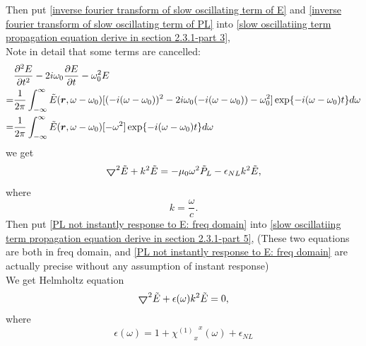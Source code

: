 \documentclass[12pt]{extarticle}
\numberwithin{equation}{section}
\numberwithin{figure}{section}
\numberwithin{table}{section}
\newcommand{\<}{\langle}
\renewcommand{\>}{\rangle}
\theoremstyle{definition}
\newcommand{\Lap}{\boldsymbol{\bigtriangledown}}
\begin{document}
\begin{itemize}
                
                Then put \autoref{inverse fourier transform of slow oscillating term of E} and \autoref{inverse fourier transform of slow oscillating term of PL} into \autoref{slow oscillatiing term propagation equation derive in section 2.3.1-part 3}, \\
                Note in detail that some terms are cancelled:
                \begin{equation}
                \begin{split}
                    &\pdv[2]{E}{t}-2i\omega_0\pdv{E}{t}-\omega_0^2 E\\
                    =&\frac{1}{2\pi}\int_{-\infty}^{\infty}\Tilde{E}(\boldsymbol{r},\omega-\omega_0)[(-i(\omega-\omega_0))^2-2i\omega_0(-i(\omega-\omega_0))-\omega_0^2]\exp{-i(\omega-\omega_0)t}d\omega\\
                    =&\frac{1}{2\pi}\int_{-\infty}^{\infty}\Tilde{E}(\boldsymbol{r},\omega-\omega_0)[-\omega^2]\exp{-i(\omega-\omega_0)t}d\omega
                \end{split}
                \label{slow oscillatiing term propagation equation derive in section 2.3.1-part 4}
                \end{equation}
                we get
                \begin{equation}
                    \Lap^2\Tilde{E}+k^2\Tilde{E}=-\mu_0 \omega^2 \Tilde{P}_L- \epsilon_{NL}k^2\Tilde{E},
                    \label{slow oscillatiing term propagation equation derive in section 2.3.1-part 5}
                \end{equation}
                where
                \begin{equation}
                    k=\frac{\omega}{c}.
                \end{equation}
                Then put \autoref{PL not instantly response to E: freq domain} into \autoref{slow oscillatiing term propagation equation derive in section 2.3.1-part 5}, (These two equations are both in freq domain, and \autoref{PL not instantly response to E: freq domain} are actually precise without any assumption of instant response)\\
                We get Helmholtz equation
                \begin{equation}
                    \Lap^2\Tilde{E}+\epsilon(\omega)k^2\Tilde{E}=0,
                    \label{Helmholtz equation in frequency domain}
                \end{equation}
                where
                \begin{equation}
                    \epsilon(\omega)=1+{{\chi^{(1)}}_x}^x(\omega)+\epsilon_{NL}
                    \label{epsilon omega relation to chi1 and epsilon nl}
                \end{equation}
                

\end{itemize}
\end{document}
